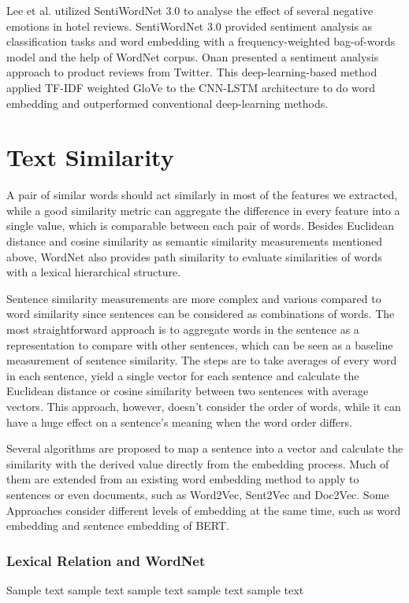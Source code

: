 Lee et al.\cite{lee2017} utilized SentiWordNet 3.0 to analyse the effect of several negative emotions in hotel reviews.
SentiWordNet 3.0\cite{baccianella2010} provided sentiment analysis as classification tasks and word embedding with a frequency-weighted bag-of-words model and the help of WordNet corpus.
Onan\cite{onan2021} presented a sentiment analysis approach to product reviews from Twitter.
This deep-learning-based method applied TF-IDF weighted GloVe to the CNN-LSTM architecture to do word embedding and outperformed conventional deep-learning methods.


\section{Text Similarity}
A pair of similar words should act similarly in most of the features we extracted, while a good similarity metric can aggregate the difference in every feature into a single value, which is comparable between each pair of words.
Besides Euclidean distance and cosine similarity as semantic similarity measurements mentioned above, WordNet also provides path similarity to evaluate similarities of words with a lexical hierarchical structure.

Sentence similarity measurements are more complex and various compared to word similarity since sentences can be considered as combinations of words.
The most straightforward approach is to aggregate words in the sentence as a representation to compare with other sentences, which can be seen as a baseline measurement of sentence similarity.
The steps are to take averages of every word in each sentence, yield a single vector for each sentence and calculate the Euclidean distance or cosine similarity between two sentences with average vectors.
This approach, however, doesn't consider the order of words, while it can have a huge effect on a sentence's meaning when the word order differs.

Several algorithms are proposed to map a sentence into a vector and calculate the similarity with the derived value directly from the embedding process.
Much of them are extended from an existing word embedding method to apply to sentences or even documents, such as Word2Vec, Sent2Vec and Doc2Vec.
Some Approaches consider different levels of embedding at the same time, such as word embedding and sentence embedding of BERT.

\subsubsection{Lexical Relation and WordNet}
Sample text sample text sample text sample text sample text


